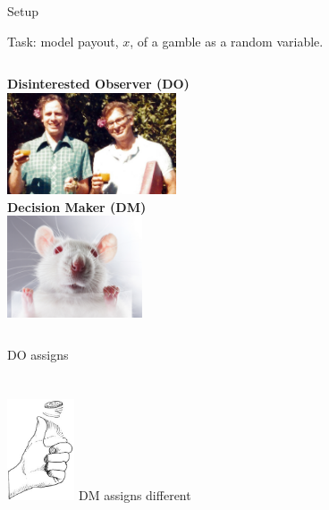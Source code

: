 \begin{frame}{Setup}
\begin{center}
Task: model payout, $x$, of a gamble as a random variable.
\end{center}
\begin{columns}[T]
	\centering
	\textbf{Disinterested Observer (DO)} \\
	\vspace{0.5em}
	\includegraphics[height=3cm]{img/TverskyKahnemanFunny} \\
	\vspace{0.5em}
	\centering
	\textbf{Decision Maker (DM)} \\
	\vspace{0.5em}
	\includegraphics[height=3cm]{img/LabRat} \\
	\vspace{0.5em}
\end{columns}

\begin{columns}[T]
	\vspace{0.5em}
	DO assigns\\
	 \\
  \\
\centering
	\includegraphics[height=3cm]{img/coinflip}
	\vspace{0.5em}
  DM assigns different\\
  \\
   \\
\end{columns}
\end{frame}

